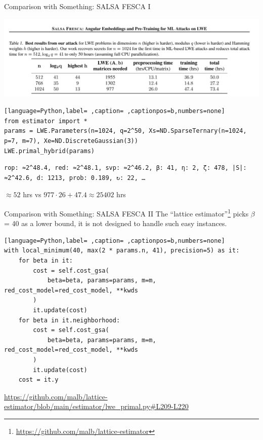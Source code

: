 \documentclass[xcolor=table,10pt,aspectratio=169]{beamer}
\begin{document}
\begin{frame}[label={sec:org1395adf},fragile]{Comparison with Something: SALSA FESCA I}
 \begin{center}
\includegraphics[width=.9\linewidth]{./salsa-fresca-results.png}
\end{center}

\begin{lstlisting}[language=Python,label= ,caption= ,captionpos=b,numbers=none]
from estimator import *
params = LWE.Parameters(n=1024, q=2^50, Xs=ND.SparseTernary(n=1024, p=7, m=7), Xe=ND.DiscreteGaussian(3))
LWE.primal_hybrid(params)
\end{lstlisting}

\begin{verbatim}
rop: ≈2^48.4, red: ≈2^48.1, svp: ≈2^46.2, β: 41, η: 2, ζ: 478, |S|: ≈2^42.6, d: 1213, prob: 0.189, ↻: 22, …
\end{verbatim}


\begin{center}
\(\approx 52\) hrs vs \(977 \cdot 26 + 47.4 \approx 25402\) hrs 
\end{center}
\end{frame}

\begin{frame}[label={sec:orged77d3a},fragile]{Comparison with \alert{Something}: SALSA FESCA II}
 The ``lattice estimator''\footnote{\url{https://github.com/malb/lattice-estimator}} picks \(\beta\) = 40 as a lower bound, it is not designed to handle such easy instances.

\begin{lstlisting}[language=Python,label= ,caption= ,captionpos=b,numbers=none]
with local_minimum(40, max(2 * params.n, 41), precision=5) as it:
    for beta in it:
        cost = self.cost_gsa(
            beta=beta, params=params, m=m, red_cost_model=red_cost_model, **kwds
        )
        it.update(cost)
    for beta in it.neighborhood:
        cost = self.cost_gsa(
            beta=beta, params=params, m=m, red_cost_model=red_cost_model, **kwds
        )
        it.update(cost)
    cost = it.y
\end{lstlisting}

{\footnotesize \url{https://github.com/malb/lattice-estimator/blob/main/estimator/lwe\_primal.py\#L209-L220} \par}
\end{frame}
\end{document}
